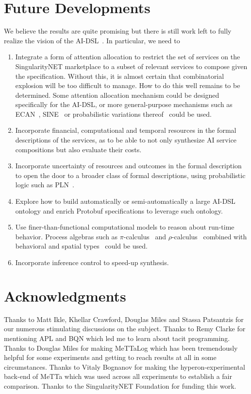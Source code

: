 \documentclass[]{report}
\begin{document}
\section{Future Developments}
We believe the results are quite promising but there is still work
left to fully realize the vision of the
AI-DSL~\cite{GoertzelGeisweillerBlog}.  In particular, we need to
\begin{enumerate}
\item Integrate a form of attention allocation to restrict the set of
  services on the SingularityNET marketplace to a subset of relevant
  services to compose given the specification.  Without this, it is
  almost certain that combinatorial explosion will be too difficult to
  manage.  How to do this well remains to be determined.  Some
  attention allocation mechanism could be designed specifically for
  the AI-DSL, or more general-purpose mechanisms such as
  ECAN~\cite{Pitt2009}, SINE~\cite{Hoder2011} or probabilistic
  variations thereof~\cite{Agnieszka2019} could be used.
\item Incorporate financial, computational and temporal resources in
  the formal descriptions of the services, as to be able to not only
  synthesize AI service compositions but also evaluate their costs.
\item Incorporate uncertainty of resources and outcomes in the formal
  description to open the door to a broader class of formal
  descriptions, using probabilistic logic such as
  PLN~\cite{Goertzel09PLN}.
\item Explore how to build automatically or semi-automatically a large
  AI-DSL ontology and enrich Protobuf specifications to leverage such
  ontology.
\item Use finer-than-functional computational models to reason about
  run-time behavior.  Process algebras such as
  $\pi$-calculus~\cite{Milner1999} and
  $\rho$-calculus~\cite{Meredith2005} combined with behavioral and
  spatial types~\cite{Acciai2010} could be used.
\item Incorporate inference control to speed-up synthesis.
\end{enumerate}

\section{Acknowledgments}
Thanks to Matt Ikle, Khellar Crawford, Douglas Miles and Stassa
Patsantzis for our numerous stimulating discussions on the subject.
Thanks to Remy Clarke for mentioning APL and BQN which led me to learn
about tacit programming.  Thanks to Douglas Miles for making
\mbox{MeTTaLog} which has been tremendously helpful for some
experiments and getting to reach results at all in some circumstances.
Thanks to Vitaly Bognanov for making the hyperon-experimental back-end
of MeTTa which was used across all experiments to establish a fair
comparison.  Thanks to the SingularityNET Foundation for funding this
work.

 
\end{document}
